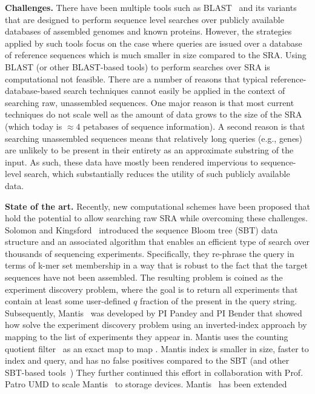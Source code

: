 \noindent
{\bf Challenges.}
There have been multiple tools such as BLAST~\cite{altschul1990basic} and its variants that are designed to perform sequence level searches over publicly available databases of assembled genomes and known proteins. %
However, the strategies applied by such tools focus on the case where queries are issued over a database of reference sequences which is much smaller in size compared to the SRA. 
Using BLAST (or other BLAST-based tools) to perform searches over SRA is computational not feasible.
%
There are a number of reasons that typical reference-database-based search techniques cannot easily be applied in the context of searching raw, unassembled sequences. One major reason is that most current techniques do not scale well as the amount of data grows to the size of the SRA (which today is $\approx4$ petabases of sequence information). A second reason is that searching unassembled sequences means that relatively long queries (e.g., genes) are unlikely to be present in their entirety as an approximate substring of the input.
As such, these data have mostly been rendered impervious to sequence-level search, which substantially reduces the utility of such publicly available data.


\noindent
{\bf State of the art.}
Recently, new computational schemes have been proposed that hold the potential to allow searching raw SRA while overcoming these challenges. Solomon and Kingsford~\cite{solomon2016fast} introduced the sequence Bloom tree (SBT) data structure and an associated algorithm that enables an efficient type of search over thousands of sequencing experiments. Specifically, they re-phrase the query in terms of k-mer set membership in a way that is robust to the fact that the target sequences have not been assembled. The resulting problem is coined as the experiment discovery problem, where the goal is to return all experiments that contain at least some user-defined $q$ fraction of the \kmers present in the query string.
%
Subsequently, Mantis~\cite{PandeyABFJP18Cell} was developed by PI Pandey and PI Bender that showed how solve the experiment discovery problem using an inverted-index approach by mapping \kmers to the list of experiments they appear in. Mantis uses the counting quotient filter~\cite{PandeyBJP17} as an exact map to map \kmers. Mantis index is smaller in size, faster to index and query, and has no false positives compared to the SBT (and other SBT-based tools~\cite{solo})
%
They further continued this effort in collaboration with Prof. Patro UMD to scale Mantis~\cite{AlmodaresiPFJP19,AlmodaresiPFJP20} to storage devices.
Mantis~\cite{AlmodaresiPFJP19,AlmodaresiPFJP20,almodaresi2022incrementally} has been extended 



